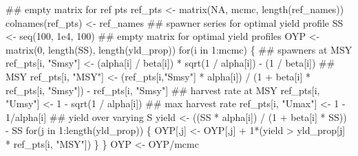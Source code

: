 \documentclass[
  11pt,
]{article}
\newenvironment{Shaded}{}{}
\newcommand{\ConstantTok}[1]{#1}
\newcommand{\ControlFlowTok}[1]{\textcolor[rgb]{0.00,0.00,1.00}{#1}}
\newcommand{\DecValTok}[1]{#1}
\newcommand{\DocumentationTok}[1]{\textcolor[rgb]{0.00,0.50,0.00}{#1}}
\newcommand{\FloatTok}[1]{#1}
\newcommand{\FunctionTok}[1]{#1}
\newcommand{\NormalTok}[1]{#1}
\newcommand{\OtherTok}[1]{\textcolor[rgb]{1.00,0.25,0.00}{#1}}
\newcommand{\SpecialCharTok}[1]{\textcolor[rgb]{0.00,0.50,0.50}{#1}}
\newcommand{\StringTok}[1]{\textcolor[rgb]{0.00,0.50,0.50}{#1}}
\begin{document}
\begin{Shaded}
\begin{Highlighting}[]
\DocumentationTok{\#\# empty matrix for ref pts}
\NormalTok{ref\_pts }\OtherTok{\textless{}{-}} \FunctionTok{matrix}\NormalTok{(}\ConstantTok{NA}\NormalTok{, mcmc, }\FunctionTok{length}\NormalTok{(ref\_names))}
\FunctionTok{colnames}\NormalTok{(ref\_pts) }\OtherTok{\textless{}{-}}\NormalTok{ ref\_names}
\DocumentationTok{\#\# spawner series for optimal yield profile}
\NormalTok{SS }\OtherTok{\textless{}{-}} \FunctionTok{seq}\NormalTok{(}\DecValTok{100}\NormalTok{, }\FloatTok{1e4}\NormalTok{, }\DecValTok{100}\NormalTok{)}
\DocumentationTok{\#\# empty matrix for optimal yield profiles}
\NormalTok{OYP }\OtherTok{\textless{}{-}} \FunctionTok{matrix}\NormalTok{(}\DecValTok{0}\NormalTok{, }\FunctionTok{length}\NormalTok{(SS), }\FunctionTok{length}\NormalTok{(yld\_prop))}
\ControlFlowTok{for}\NormalTok{(i }\ControlFlowTok{in} \DecValTok{1}\SpecialCharTok{:}\NormalTok{mcmc) \{}
    \DocumentationTok{\#\# spawners at MSY}
\NormalTok{    ref\_pts[i, }\StringTok{"Smsy"}\NormalTok{] }\OtherTok{\textless{}{-}}\NormalTok{ (alpha[i] }\SpecialCharTok{/}\NormalTok{ beta[i]) }\SpecialCharTok{*} \FunctionTok{sqrt}\NormalTok{(}\DecValTok{1} \SpecialCharTok{/}\NormalTok{ alpha[i]) }\SpecialCharTok{{-}}\NormalTok{ (}\DecValTok{1} \SpecialCharTok{/}\NormalTok{ beta[i])}
    \DocumentationTok{\#\# MSY}
\NormalTok{    ref\_pts[i, }\StringTok{"MSY"}\NormalTok{] }\OtherTok{\textless{}{-}}\NormalTok{ (ref\_pts[i,}\StringTok{"Smsy"}\NormalTok{] }\SpecialCharTok{*}\NormalTok{ alpha[i]) }\SpecialCharTok{/}
\NormalTok{                            (}\DecValTok{1} \SpecialCharTok{+}\NormalTok{ beta[i] }\SpecialCharTok{*}\NormalTok{ ref\_pts[i, }\StringTok{"Smsy"}\NormalTok{]) }\SpecialCharTok{{-}}\NormalTok{ ref\_pts[i, }\StringTok{"Smsy"}\NormalTok{]}
    \DocumentationTok{\#\# harvest rate at MSY}
\NormalTok{    ref\_pts[i, }\StringTok{"Umsy"}\NormalTok{] }\OtherTok{\textless{}{-}} \DecValTok{1} \SpecialCharTok{{-}} \FunctionTok{sqrt}\NormalTok{(}\DecValTok{1} \SpecialCharTok{/}\NormalTok{ alpha[i])}
    \DocumentationTok{\#\# max harvest rate}
\NormalTok{    ref\_pts[i, }\StringTok{"Umax"}\NormalTok{] }\OtherTok{\textless{}{-}} \DecValTok{1} \SpecialCharTok{{-}} \DecValTok{1}\SpecialCharTok{/}\NormalTok{alpha[i]}
    \DocumentationTok{\#\# yield over varying S}
\NormalTok{    yield }\OtherTok{\textless{}{-}}\NormalTok{ ((SS }\SpecialCharTok{*}\NormalTok{ alpha[i]) }\SpecialCharTok{/}\NormalTok{ (}\DecValTok{1} \SpecialCharTok{+}\NormalTok{ beta[i] }\SpecialCharTok{*}\NormalTok{ SS)) }\SpecialCharTok{{-}}\NormalTok{ SS}
    \ControlFlowTok{for}\NormalTok{(j }\ControlFlowTok{in} \DecValTok{1}\SpecialCharTok{:}\FunctionTok{length}\NormalTok{(yld\_prop)) \{}
\NormalTok{        OYP[,j] }\OtherTok{\textless{}{-}}\NormalTok{ OYP[,j] }\SpecialCharTok{+} \DecValTok{1}\SpecialCharTok{*}\NormalTok{(yield }\SpecialCharTok{\textgreater{}}\NormalTok{ yld\_prop[j] }\SpecialCharTok{*}\NormalTok{ ref\_pts[i, }\StringTok{"MSY"}\NormalTok{])}
\NormalTok{    \}}
\NormalTok{\}}
\NormalTok{OYP }\OtherTok{\textless{}{-}}\NormalTok{ OYP}\SpecialCharTok{/}\NormalTok{mcmc}


\end{Highlighting}
\end{Shaded}
\end{document}
